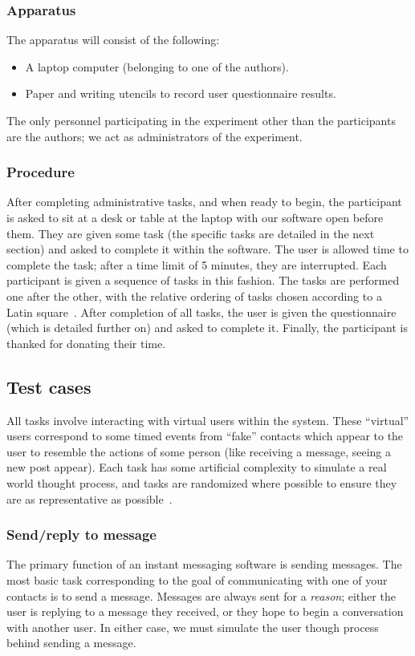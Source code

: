 \documentclass{sigchi}
\begin{document}
  \subsubsection{Apparatus}
  The apparatus will consist of the following:
  \begin{itemize}
  \item A laptop computer (belonging to one of the authors).
  \item Paper and writing utencils to record user questionnaire results.
  \end{itemize}

  The only personnel participating in the experiment other than the participants
  are the authors; we act as administrators of the experiment.  

  \subsubsection{Procedure}
  After completing administrative tasks, and when ready to begin, the
  participant is asked to sit at a desk or table at the laptop with our software
  open before them. They are given some task (the specific tasks are detailed in
  the next section) and asked to complete it within the software. The user is
  allowed time to complete the task; after a time limit of 5 minutes, they are
  interrupted.  Each participant is given a sequence of tasks in this
  fashion. The tasks are performed one after the other, with the relative
  ordering of tasks chosen according to a Latin square~\cite[p. 178]{Mackenzie:HCI}. 
  After completion of all tasks, the user is given the questionnaire (which is
  detailed further on) and asked to complete it. Finally, the participant is
  thanked for donating their time.

 \subsection{Test cases}
 All tasks involve interacting with virtual users within the system. These
 ``virtual'' users correspond to some timed events from ``fake'' contacts which
 appear to the user to resemble the actions of some person (like receiving a
 message, seeing a new post appear). Each task has some artificial complexity 
 to simulate a real world thought process, and tasks are randomized where possible
 to ensure they are as representative as possible~\cite[p. 169]{Mackenzie:HCI}. 

  \subsubsection{Send/reply to message} 
  The primary function of an instant messaging software is sending messages. The
  most basic task corresponding to the goal of communicating with one of your
  contacts is to send a message. Messages are always sent for a \emph{reason};
  either the user is replying to a message they received, or they hope to begin
  a conversation with another user. In either case, we must simulate the user
  though process behind sending a message.
  
\end{document}
